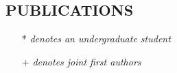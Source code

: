 \documentclass[margin]{res}
\begin{document}
\begin{resume}

				


\section{PUBLICATIONS} 

\begin{itemize}

\item[*] \textit{denotes an undergraduate student}
\item[+] \textit{denotes joint first authors }
\end{itemize}



\end{resume}
\end{document}
